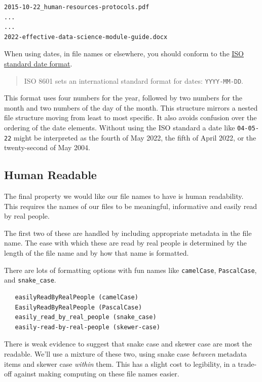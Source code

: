 \documentclass[
  letterpaper,
  DIV=11,
  numbers=noendperiod]{scrreprt}
\begin{document}
\begin{verbatim}
2015-10-22_human-resources-protocols.pdf
...
...
2022-effective-data-science-module-guide.docx
\end{verbatim}

When using dates, in file names or elsewhere, you should conform to the
\href{https://en.wikipedia.org/wiki/ISO_8601}{ISO standard date format}.

\begin{quote}
ISO 8601 sets an international standard format for dates:
\texttt{YYYY-MM-DD}.
\end{quote}

This format uses four numbers for the year, followed by two numbers for
the month and two numbers of the day of the month. This structure
mirrors a nested file structure moving from least to most specific. It
also avoids confusion over the ordering of the date elements. Without
using the ISO standard a date like \texttt{04-05-22} might be
interpreted as the fourth of May 2022, the fifth of April 2022, or the
twenty-second of May 2004.

\subsection{Human Readable}\label{human-readable}

The final property we would like our file names to have is human
readability. This requires the names of our files to be meaningful,
informative and easily read by real people.

The first two of these are handled by including appropriate metadata in
the file name. The ease with which these are read by real people is
determined by the length of the file name and by how that name is
formatted.

There are lots of formatting options with fun names like
\texttt{camelCase}, \texttt{PascalCase}, and \texttt{snake\_case}.

\begin{verbatim}
   easilyReadByRealPeople (camelCase)
   EasilyReadByRealPeople (PascalCase)
   easily_read_by_real_people (snake_case)
   easily-read-by-real-people (skewer-case)
\end{verbatim}

There is weak evidence to suggest that snake case and skewer case are
most the readable. We'll use a mixture of these two, using snake case
\emph{between} metadata items and skewer case \emph{within} them. This
has a slight cost to legibility, in a trade-off against making computing
on these file names easier.
\end{document}
